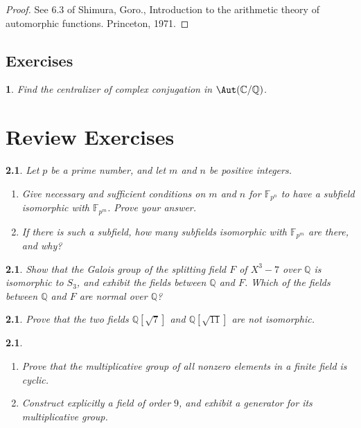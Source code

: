 \documentclass[a4paper,11pt,final,openany]{memoir}
\newtheorem{exercise}[Y]{}
\theoremstyle{nonumberplain}
\newtheorem{proof}{Proof.}
\begin{document}
\begin{proof}
See 6.3 of Shimura, Goro., Introduction to the arithmetic theory of
automorphic functions. Princeton, 1971.
\end{proof}

\section{Exercises}

\begin{exercise}
\label{x91} Find the centralizer of complex conjugation in $\Aut(\mathbb{C}%
{}/\mathbb{Q}{})$.
\end{exercise}

\appendix\clearpage


\chapter{Review Exercises}

\renewcommand{\theY}{A-\arabic{Y}}

\begin{exercise}
\label{x24}Let $p$ be a prime number, and let $m$ and $n$ be positive integers.

\begin{enumerate}
\item Give necessary and sufficient conditions on $m$ and $n$ for
$\mathbb{F}_{p^{n}}$ to have a subfield isomorphic with $\mathbb{F}_{p^{m}}$.
Prove your answer.

\item If there is such a subfield, how many subfields isomorphic with
$\mathbb{F}_{p^{m}}$ are there, and why?
\end{enumerate}
\end{exercise}

\begin{exercise}
\label{x25} Show that the Galois group of the splitting field $F$ of $X^{3}-7$
over ${\mathbb{Q}}$ is isomorphic to $S_{3}$, and exhibit the fields between
${\mathbb{Q}}$ and $F$. Which of the fields between ${\mathbb{Q}}$ and $F$ are
normal over ${\mathbb{Q}}$?
\end{exercise}

\begin{exercise}
\label{x26} Prove that the two fields ${\mathbb{Q}}[\sqrt7]$ and ${\mathbb{Q}%
}[\sqrt{11}]$ are not isomorphic.
\end{exercise}

\begin{exercise}
\label{x27}

\begin{enumerate}
\item Prove that the multiplicative group of all nonzero elements in a finite
field is cyclic.

\item Construct explicitly a field of order $9$, and exhibit a generator for
its multiplicative group.
\end{enumerate}
\end{exercise}
\end{document}
